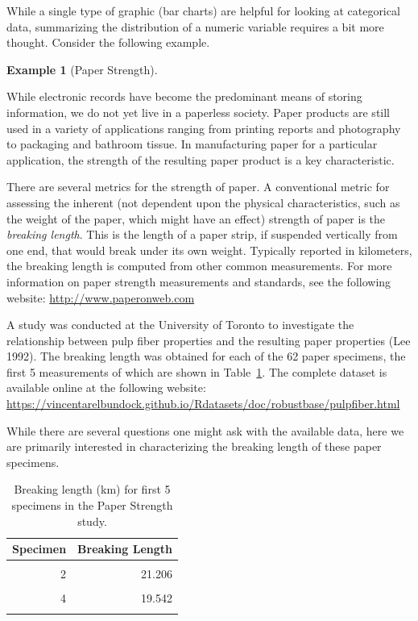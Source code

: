 \documentclass[
  letterpaper,
  DIV=11,
  numbers=noendperiod]{scrreprt}
\theoremstyle{definition}
\theoremstyle{plain}
\theoremstyle{definition}
\newtheorem{example}{Example}[chapter]
\theoremstyle{remark}
\begin{document}
While a single type of graphic (bar charts) are helpful for looking at
categorical data, summarizing the distribution of a numeric variable
requires a bit more thought. Consider the following example.

\begin{example}[Paper
Strength]\protect\hypertarget{exm-summaries-paper}{}\label{exm-summaries-paper}

While electronic records have become the predominant means of storing
information, we do not yet live in a paperless society. Paper products
are still used in a variety of applications ranging from printing
reports and photography to packaging and bathroom tissue. In
manufacturing paper for a particular application, the strength of the
resulting paper product is a key characteristic.

There are several metrics for the strength of paper. A conventional
metric for assessing the inherent (not dependent upon the physical
characteristics, such as the weight of the paper, which might have an
effect) strength of paper is the \emph{breaking length}. This is the
length of a paper strip, if suspended vertically from one end, that
would break under its own weight. Typically reported in kilometers, the
breaking length is computed from other common measurements. For more
information on paper strength measurements and standards, see the
following website: \url{http://www.paperonweb.com}

A study was conducted at the University of Toronto to investigate the
relationship between pulp fiber properties and the resulting paper
properties (Lee 1992). The breaking length was obtained for each of the
62 paper specimens, the first 5 measurements of which are shown in
Table~\ref{tbl-summaries-paper-table}. The complete dataset is available
online at the following website:
\url{https://vincentarelbundock.github.io/Rdatasets/doc/robustbase/pulpfiber.html}

While there are several questions one might ask with the available data,
here we are primarily interested in characterizing the breaking length
of these paper specimens.

\end{example}

\hypertarget{tbl-summaries-paper-table}{}
\begin{table}
\caption{\label{tbl-summaries-paper-table}Breaking length (km) for first 5 specimens in the Paper Strength study. }\tabularnewline

\centering
\begin{tabular}[t]{rr}
\toprule
Specimen & Breaking Length\\
\midrule
\cellcolor{gray!6}{1} & \cellcolor{gray!6}{21.312}\\
2 & 21.206\\
\cellcolor{gray!6}{3} & \cellcolor{gray!6}{20.709}\\
4 & 19.542\\
\cellcolor{gray!6}{5} & \cellcolor{gray!6}{20.449}\\
\bottomrule
\end{tabular}
\end{table}
\end{document}
